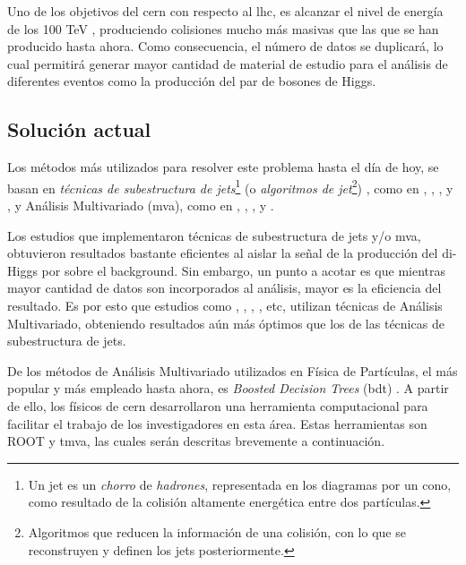 Uno de los objetivos del \acrshort{cern} con respecto al \acrshort{lhc}, es alcanzar el nivel de energía de los 100 TeV \cite{Arkani2016}, produciendo colisiones mucho más masivas que las que se han producido hasta ahora. Como consecuencia, el número de datos se duplicará, lo cual permitirá generar mayor cantidad de material de estudio para el análisis de diferentes eventos como la producción del par de bosones de Higgs.

\subsection{Solución actual}

Los métodos más utilizados para resolver este problema hasta el día de hoy, se basan en \textit{técnicas de subestructura de jets}\footnote{Un jet es un \emph{chorro} de \textit{hadrones}, representada en los diagramas por un cono, como resultado de la colisión altamente energética entre dos partículas.} (o \textit{algoritmos de jet}\footnote{Algoritmos que reducen la información de una colisión, con lo que se reconstruyen y definen los jets posteriormente.}) \cite{Chekanov2003}, como en \cite{Papaefstathiou2013}, \cite{Wardrope2015}, \cite{Larkoski2017}, \cite{Dolan2012} y \cite{Barr2013}, y Análisis Multivariado (\acrshort{mva}), como en \cite{Papaefstathiou2013}, \cite{Adhikary2017}, \cite{Barger2013}, \cite{Kling2016} y \cite{Alves2017}.

Los estudios que implementaron técnicas de subestructura de jets y/o \acrshort{mva}, obtuvieron resultados bastante eficientes al aislar la señal de la producción del di-Higgs por sobre el background. Sin embargo, un punto a acotar es que mientras mayor cantidad de datos son incorporados al análisis, mayor es la eficiencia del resultado. Es por esto que estudios como \cite{ATLAS2016}, \cite{Papaefstathiou2013}, \cite{Chien2018}, \cite{Cui2010}, etc, utilizan técnicas de Análisis Multivariado, obteniendo resultados aún más óptimos que los de las técnicas de subestructura de jets.

De los métodos de Análisis Multivariado utilizados en Física de Partículas, el más popular y más empleado hasta ahora, es \emph{Boosted Decision Trees} (\acrshort{bdt}) \cite{Roe2005} \cite{Radovic2018}. A partir de ello, los físicos de \acrshort{cern} desarrollaron una herramienta computacional para facilitar el trabajo de los investigadores en esta área. Estas herramientas son ROOT y \acrshort{tmva}, las cuales serán descritas brevemente a continuación. 
%


